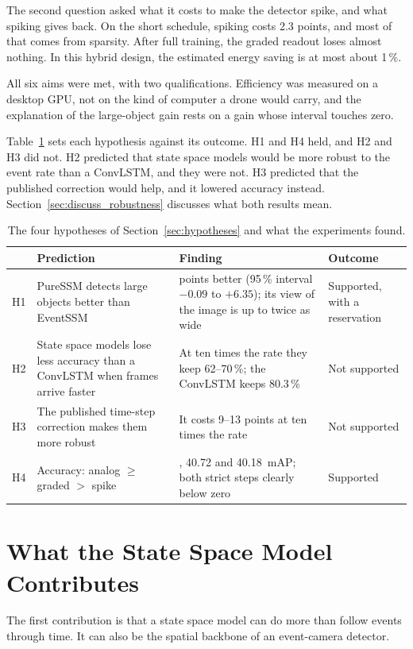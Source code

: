\documentclass[11pt, a4paper]{report}
\begin{document}
The second question asked what it costs to make the detector spike, and what spiking gives back. On the
short schedule, spiking costs 2.3 points, and most of that comes from sparsity. After full
training, the graded readout loses almost nothing. In this hybrid design, the estimated energy saving is at most about 1\,\%.

All six aims were met, with two qualifications. Efficiency was measured on a desktop GPU, not on the kind of computer a drone would carry, and the explanation of the large-object gain rests on a gain
whose interval touches zero.

Table~\ref{tab:hypotheses} sets each hypothesis against its outcome. H1 and H4 held, and H2 and H3 did not. H2 predicted that state space models would be more robust to the event rate than a ConvLSTM, and they were not. H3 predicted that the published correction would help, and it lowered accuracy instead. Section~\ref{sec:discuss_robustness} discusses what both results mean.

\begin{table}[htbp]
\centering
\small
\caption[The four hypotheses and their outcomes]{The four hypotheses of Section~\ref{sec:hypotheses} and what the
    experiments found.}
\label{tab:hypotheses}
\begin{tabularx}{\textwidth}{@{}l>{\raggedright\arraybackslash}X>{\raggedright\arraybackslash}X>{\raggedright\arraybackslash}p{2.3cm}@{}}
\toprule
 & \textbf{Prediction} & \textbf{Finding} & \textbf{Outcome} \\
\midrule
H1 & PureSSM detects large objects better than EventSSM & 2.95 points better (95\,\% interval $-0.09$ to $+6.35$);
     its view of the image is up to twice as wide & Supported, with a reservation \\
H2 & State space models lose less accuracy than a ConvLSTM when frames arrive faster & At ten times the rate
     they keep 62--70\,\%; the ConvLSTM keeps 80.3\,\% & Not supported \\
H3 & The published time-step correction makes them more robust & It costs 9--13 points at ten times the rate
     & Not supported \\
H4 & Accuracy: analog $\geq$ graded $>$ spike & 42.25, 40.72 and 40.18~mAP; both strict steps clearly below
     zero & Supported \\
\bottomrule
\end{tabularx}
\end{table}
\newpage

\section{What the State Space Model Contributes}
\label{sec:what_shown}
The first contribution is that a state space model can do more than follow events through time. It can also be the spatial backbone of an event-camera detector.
\end{document}
